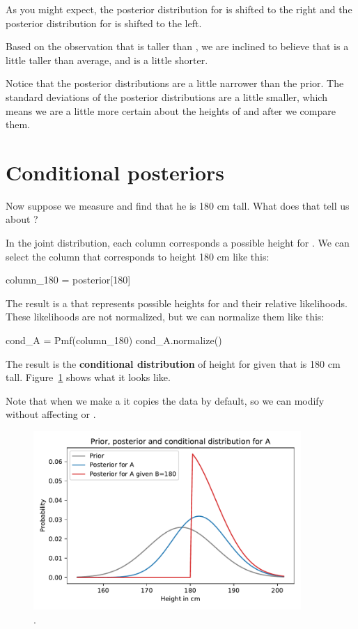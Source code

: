 \documentclass[12pt]{book}
\theoremstyle{exercise}
\begin{document}
As you might expect, the posterior distribution for  is shifted to the right and the posterior distribution for  is shifted to the left.

Based on the observation that  is taller than , we are inclined to believe that  is a little taller than average, and  is a little shorter.

Notice that the posterior distributions are a little narrower than the prior.  
The standard deviations of the posterior distributions are a little smaller, which means we are a little more certain about the heights of  and  after we compare them.


\section{Conditional posteriors}

Now suppose we measure  and find that he is 180 cm tall.  What does that tell us about ?

In the joint distribution, each column corresponds a possible height for .  We can select the column that corresponds to height 180 cm like this:

\begin{code}
column_180 = posterior[180]
\end{code}

The result is a  that represents possible heights for  and their relative likelihoods.
These likelihoods are not normalized, but we can normalize them like this:

\begin{code}
cond_A = Pmf(column_180)
cond_A.normalize()
\end{code}

The result is the {\bf conditional distribution} of height for  given that  is 180 cm tall.
Figure~\ref{fig09-05} shows what it looks like.

Note that when we make a  it copies the data by default, so we can modify  without affecting  or .

\begin{figure}
\centerline{\includegraphics[width=4in]{figs/fig09-05.pdf}}
\caption{.}
\label{fig09-05}
\end{figure}
\end{document}
